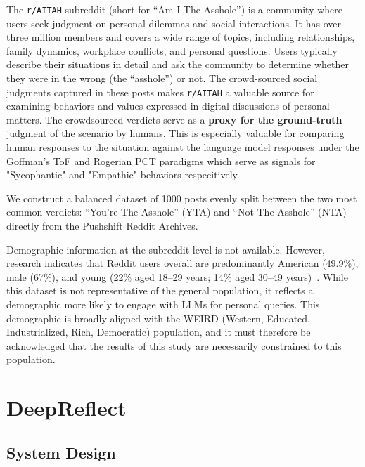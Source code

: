 \medskip The \texttt{r/AITAH} subreddit (short for ``Am I The Asshole'') is a community where users seek judgment on personal dilemmas and social interactions. It has over three million members and covers a wide range of topics, including relationships, family dynamics, workplace conflicts, and personal questions. Users typically describe their situations in detail and ask the community to determine whether they were in the wrong (the ``asshole'') or not. The crowd-sourced social judgments captured in these posts makes \texttt{r/AITAH} a valuable source for examining behaviors and values expressed in digital discussions of personal matters. The crowdsourced verdicts serve as a \textbf{proxy for the ground-truth} judgment of the scenario by humans. This is especially valuable for comparing human responses to the situation against the language model responses under the Goffman's ToF and Rogerian PCT paradigms which serve as signals for "Sycophantic" and "Empathic" behaviors respecitively. 

We construct a balanced dataset of 1000 posts evenly split between the two most common verdicts: ``You're The Asshole'' (YTA) and ``Not The Asshole'' (NTA) directly from the Pushshift Reddit Archives.

Demographic information at the subreddit level is not available. However, research indicates that Reddit users overall are predominantly American (49.9\%), male (67\%), and young (22\% aged 18--29 years; 14\% aged 30--49 years)~\cite{pew-reddit-research,statista-reddit}. While this dataset is not representative of the general population, it reflects a demographic more likely to engage with LLMs for personal queries. This demographic is broadly aligned with the WEIRD (Western, Educated, Industrialized, Rich, Democratic) population, and it must therefore be acknowledged that the results of this study are necessarily constrained to this population.

\section{DeepReflect}\label{sec:deepreflect}

\subsection{System Design}

